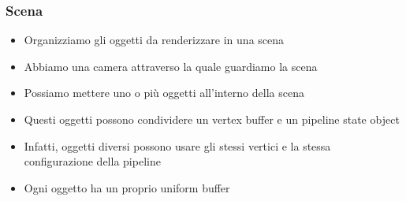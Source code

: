 \begin{frame}
\frametitle{Scena}
\begin{itemize}
\item Organizziamo gli oggetti da renderizzare in una scena
\item Abbiamo una camera attraverso la quale guardiamo la scena
\item Possiamo mettere uno o più oggetti all'interno della scena
\item Questi oggetti possono condividere un vertex buffer e un pipeline state object
\item Infatti, oggetti diversi possono usare gli stessi vertici e la stessa configurazione della pipeline
\item Ogni oggetto ha un proprio uniform buffer
\end{itemize}
\end{frame}
